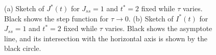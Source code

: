 \begin{figure}[h]
    \centering
{}
\caption{(a) Sketch of $J^*(t)$ for $J_{ss}=1$ and $t^*=2$ fixed while $\tau$ varies. Black shows the step function for $\tau \rightarrow 0$. (b) Sketch of $I^*(t)$ for $J_{ss}=1$ and $t^*=2$ fixed while $\tau$ varies. Black shows the asymptote line, and its intersection with the horizontal axis is shown by the black circle.}\label{fig:nuc_rates_fixedinc}
\end{figure}

